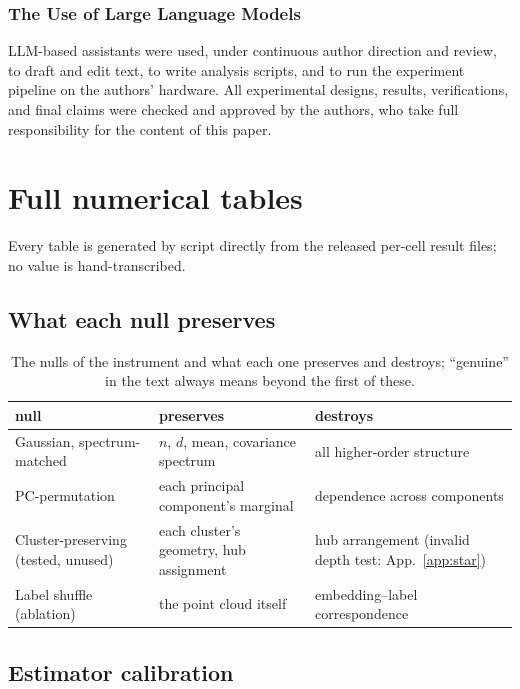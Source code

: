 \documentclass{article}
\begin{document}
\subsubsection*{The Use of Large Language Models}
LLM-based assistants were used, under continuous author direction and review, to draft and edit text, to write analysis scripts, and to run the experiment pipeline on the authors' hardware. All experimental designs, results, verifications, and final claims were checked and approved by the authors, who take full responsibility for the content of this paper.

\FloatBarrier



\clearpage
\appendix
\section{Full numerical tables}
\label{app:tables}
Every table is generated by script directly from the released per-cell result files; no value is hand-transcribed.

\FloatBarrier
\subsection{What each null preserves}
\label{app:nulls}
\begin{table}[H]
\centering\footnotesize
\begin{tabular}{p{3.1cm} p{4.2cm} p{5.1cm}}
\toprule
null & preserves & destroys \\
\midrule
Gaussian, spectrum-matched & $n$, $d$, mean, covariance spectrum & all higher-order structure \\
PC-permutation & each principal component's marginal & dependence across components \\
Cluster-preserving (tested, unused) & each cluster's geometry, hub assignment & hub arrangement (invalid depth test: App.~\ref{app:star}) \\
Label shuffle (ablation) & the point cloud itself & embedding--label correspondence \\
\bottomrule
\end{tabular}
\caption{The nulls of the instrument and what each one preserves and destroys; ``genuine'' in the text always means beyond the first of these.}
\label{tab:nulls}
\end{table}

\FloatBarrier
\subsection{Estimator calibration}
\label{app:calibration}

\end{document}
